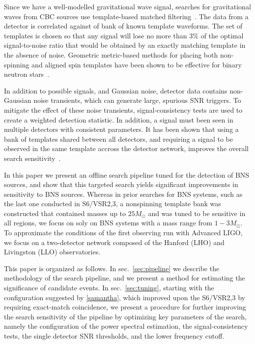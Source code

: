 Since we have a well-modelled gravitational wave signal, searches for gravitational waves from CBC sources use template-based matched filtering~\cite{Allen}. The data from a detector is correlated against of bank of known template waveforms. The set of templates is chosen so that any signal will lose no more than $3\%$ of the optimal signal-to-noise ratio that would be obtained by an exactly matching template in the absence of noise. Geometric metric-based methods for placing both non-spinning and aligned spin templates have been shown to be effective for binary neutron stars~\cite{brown}.

In addition to possible signals, and Gaussian noise, detector data contains non-Gaussian noise transients, which can generate large, spurious SNR triggers. To mitigate the effect of these noise transients, signal-consistency tests are used to create a weighted detection statistic. In addition, a signal must been seen in multiple detectors with consistent parameters. It has been shown that using a bank of templates shared between all detectors, and requiring a signal to be observed in the same template accross the detector network, improves the overall search sensitivity~\cite{samantha}. 

In this paper we present an offline search pipeline tuned for the detection of BNS sources, and show that this targeted search yields significant improvements in sensitivity to BNS sources. Whereas in prior searches for BNS systems, such as the last one conducted in S6/VSR2,3, a nonspinning template bank was constructed that contained masses up to $25M_\odot$ \cite{s6paper} and was tuned to be sensitive in all regions, we focus on soly on BNS systems with a mass range from $1-3 M_\odot$. To approximate the conditions of the first observing run with Advanced LIGO, we focus on a two-detector network composed of the Hanford (LHO) and Livingston (LLO) observatories.

This paper is organized as follows. In sec.~\ref{sec:pipeline} we describe the methodology of the search pipeline, and we present a method for estimating the significance of candidate events. In sec.~\ref{sec:tuning}, starting with the configuration suggested by \ref{samantha}, which improved upon the S6/VSR2,3 by requiring exact-match coincidence, we present a procedure for further improving the search sensitivity of the pipeline by optimizing key parameters of the search, namely the configuration of the power spectral estimation, the signal-consistency tests, the single detector SNR thresholds, and the lower frequency cutoff. 

